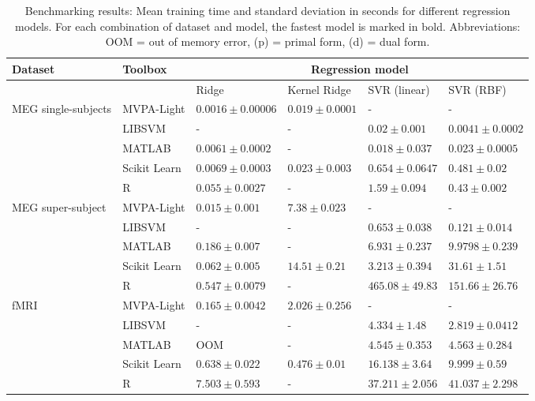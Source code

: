\documentclass[utf8]{frontiersSCNS} %
\begin{document}
\begin{table}
\footnotesize
\begin{tabular}{ |p{1.1cm}|p{1.8cm}|p{2cm}|p{2cm}|p{2cm}|p{2cm}|}
 \hline
 Dataset & Toolbox  & \multicolumn{4}{c|}{Regression model}\\ \hline
\multicolumn{2}{|c|}{}  & Ridge & Kernel Ridge & SVR (linear) & SVR (RBF)\\
 \hline
\multirow{4}{1.3cm}{MEG single-subjects} & MVPA-Light  & $\mathbf{0.0016}\pm0.00006$ & $\mathbf{0.019}\pm0.0001$ & - & -\\
\cline{2-6}
  & LIBSVM & - &  - & $0.02\pm0.001$ & $\mathbf{0.0041}\pm0.0002$ \\
\cline{2-6}
  & MATLAB & $0.0061\pm0.0002$ & - & $\mathbf{0.018}\pm0.037$ & $0.023\pm0.0005$\\   %
\cline{2-6}
  & Scikit Learn & $0.0069\pm0.0003$ & $0.023\pm0.003$ & $0.654\pm0.0647$ & $0.481\pm0.02$\\
\cline{2-6}
  & R & $0.055\pm0.0027$ & - & $1.59\pm0.094$ & $0.43\pm0.002$ \\\hline
 \hline
 \multirow{4}{1.3cm}{MEG super-subject} & MVPA-Light & $\mathbf{0.015}\pm0.001$ & $\mathbf{7.38}\pm0.023$ & - & -\\
\cline{2-6}
  & LIBSVM & - &  - & $\mathbf{0.653}\pm0.038$ & $\mathbf{0.121}\pm0.014$ \\
\cline{2-6}
  & MATLAB & $0.186\pm0.007$ & - & $6.931\pm0.237$ & $9.9798\pm0.239$\\
\cline{2-6}
  & Scikit Learn & $0.062\pm0.005$ & $14.51\pm0.21$ & $3.213\pm0.394$ & $31.61\pm1.51$\\
\cline{2-6}
  & R & $0.547\pm0.0079$ & - & $465.08\pm49.83$ & $151.66\pm26.76$\\\hline
  \hline
\multirow{4}{1.3cm}{fMRI} & MVPA-Light & $\mathbf{0.165}\pm0.0042$ & $2.026\pm0.256$ & - & -\\
\cline{2-6}
  & LIBSVM & - &  - & $\mathbf{4.334}\pm1.48$ & $\mathbf{2.819}\pm0.0412$ \\
\cline{2-6}
  & MATLAB & OOM & - & $4.545\pm0.353$  & $4.563\pm0.284$\\
\cline{2-6}
  & Scikit Learn & $0.638\pm0.022$ & $\mathbf{0.476}\pm0.01$ & $16.138\pm3.64$ & $9.999\pm0.59$\\
\cline{2-6}
  & R & $7.503\pm0.593$ & - & $37.211\pm2.056$ & $41.037\pm2.298$\\\hline
\end{tabular}
\caption{Benchmarking results: Mean training time and standard deviation in seconds for different regression models. For each combination of dataset and model, the fastest model is marked in bold. Abbreviations: OOM = out of memory error, (p) = primal form, (d) = dual form.}

\label{tab:regression}
\end{table}
\end{document}
